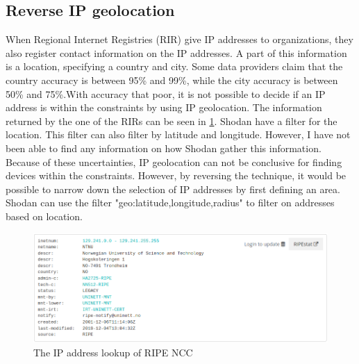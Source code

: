 \subsection{Reverse IP geolocation}
When Regional Internet Registries (RIR) give IP addresses to organizations, they also register contact information on the IP addresses. A part of this information is a location, specifying a country and city. Some data providers claim that the country accuracy is between 95\% and 99\%, while the city accuracy is between 50\% and 75\%.\cite{geolocation_acc}With accuracy that poor, it is not possible to decide if an IP address is within the constraints by using IP geolocation. The information returned by the one of the RIRs can be seen in \cref{fig:RIPE_NCC}.
Shodan have a filter for the location. This filter can also filter by latitude and longitude. However, I have not been able to find any information on how Shodan gather this information.  
Because of these uncertainties, IP geolocation can not be conclusive for finding devices within the constraints. However, by reversing the technique, it would be possible to narrow down the selection of IP addresses by first defining an area. Shodan can use the filter "geo:latitude,longitude,radius" to filter on addresses based on location.  

\begin{figure} [H]
    \centering
    \includegraphics[scale=0.5]{Figurer/ripe.png}
    \caption{The IP address lookup of RIPE NCC \cite{ripe_whois}}
    \label{fig:RIPE_NCC}
\end{figure}

